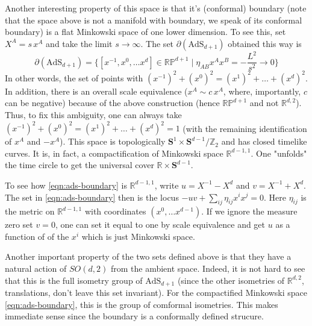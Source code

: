 \documentclass[a4paper,12pt]{article}
\begin{document}
   Another interesting property of this space is that it's (conformal) boundary (note that the space above is not a manifold with boundary, we speak of its conformal boundary) is a flat Minkowski space of one lower dimension. To see this, set $X^A = s \, x^A$ and take the limit $s \to \infty$. The set $\partial (\text{AdS}_{d+1})$ obtained this way is
   \begin{equation}\label{eqn:ads-boundary}
      \partial (\text{AdS}_{d+1}) =\{ [x^{-1}, x^{0}, \ldots x^{d}] \in \mathbb{RP}^{d+1} \mid \eta_{A B} x^A x^B = -\frac{L^2}{s^2} \to 0 \}
   \end{equation}
   In other words, the set of points with $(x^{-1})^2 + (x^{0})^2 = (x^1)^2 + \ldots + (x^d)^2$. In addition, there is an overall scale equivalence ($x^A \sim c \, x^A$, where, importantly, $c$ can be negative) because of the above construction (hence $\mathbb{RP}^{d+1}$ and not $\mathbb{R}^{d, 2}$). Thus, to fix this ambiguity, one can always take $(x^{-1})^2 + (x^{0})^2 = (x^1)^2 + \ldots + (x^d)^2 = 1$ (with the remaining identification of $x^A$ and $-x^A$). This space is topologically $\boldsymbol{S}^1 \times \boldsymbol{S}^{d-1} / \mathbb{Z}_2$ and has closed timelike curves. It is, in fact, a compactification of Minkowski space $\mathbb{R}^{d-1,1}$. One "unfolds" the time circle to get the universal cover $\mathbb{R} \times \boldsymbol{S}^{d-1}$. 
   
   To see how \ref{eqn:ads-boundary} is $\mathbb{R}^{d-1,1}$, write $u = X^{-1} - X^d$ and $v = X^{-1} + X^d$. The set in \ref{eqn:ads-boundary} then is the locus $-uv + \sum_{i j} \eta_{i j} x^i x^j = 0$. Here $\eta_{i j}$ is the metric on $\mathbb{R}^{d-1,1}$ with coordinates $(x^0, \ldots x^{d-1})$. If we ignore the measure zero set $v=0$, one can set it equal to one by scale equivalence and get $u$ as a function of of the $x^i$ which is just Minkowski space.
   
   Another important property of the two sets defined above is that they have a natural action of $\mathit{SO}(d, 2)$ from the ambient space. Indeed, it is not hard to see that this is the full isometry group of $\text{AdS}_{d + 1}$ (since the other isometries of $\mathbb{R}^{d, 2}$, translations, don't leave this set invariant). For the compactified Minkowski space \ref{eqn:ads-boundary}, this is the group of comformal isometries. This makes immediate sense since the boundary is a conformally defined strucure.
\end{document}
